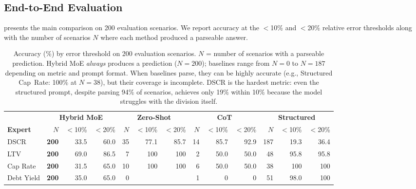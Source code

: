 \subsection{End-to-End Evaluation}
\label{sec:exp:results}

 presents the main comparison on 200 evaluation
scenarios. We report accuracy at the $<$10\% and $<$20\% relative error
thresholds along with the number of scenarios $N$ where each method
produced a parseable answer.

\begin{table}[t]
\centering
\small
\begin{tabular}{@{}l|rrr|rrr|rrr|rrr@{}}
\toprule
& \multicolumn{3}{c|}{\textbf{Hybrid MoE}} &
  \multicolumn{3}{c|}{\textbf{Zero-Shot}} &
  \multicolumn{3}{c|}{\textbf{CoT}} &
  \multicolumn{3}{c}{\textbf{Structured}} \\
\textbf{Expert} & $N$ & \tiny{$<$10\%} & \tiny{$<$20\%}
  & $N$ & \tiny{$<$10\%} & \tiny{$<$20\%}
  & $N$ & \tiny{$<$10\%} & \tiny{$<$20\%}
  & $N$ & \tiny{$<$10\%} & \tiny{$<$20\%} \\
\midrule
DSCR  & \textbf{200} & 33.5 & 60.0
      & 35  & 77.1 & 85.7
      & 14  & 85.7 & 92.9
      & 187 & 19.3 & 36.4 \\
LTV   & \textbf{200} & 69.0 & 86.5
      & 7   & 100  & 100
      & 2   & 50.0 & 50.0
      & 48  & 95.8 & 95.8 \\
Cap Rate & \textbf{200} & 31.5 & 65.0
      & 10  & 100  & 100
      & 6   & 50.0 & 50.0
      & 38  & 100  & 100 \\
Debt Yield & \textbf{200} & 35.0 & 65.0
      & 0   &      &    
      & 1   & 0    & 0
      & 51  & 98.0 & 100 \\
\bottomrule
\end{tabular}
\caption{Accuracy (\%) by error threshold on 200 evaluation scenarios.
$N$ = number of scenarios with a parseable prediction. Hybrid MoE
\emph{always} produces a prediction ($N{=}200$); baselines range from
$N{=}0$ to $N{=}187$ depending on metric and prompt format. When
baselines parse, they can be highly accurate (e.g., Structured
Cap~Rate: 100\% at $N{=}38$), but their coverage is incomplete. DSCR
is the hardest metric: even the structured prompt, despite parsing
94\% of scenarios, achieves only 19\% within 10\% because the model
struggles with the division itself.}
\label{tab:main_results}
\end{table}


